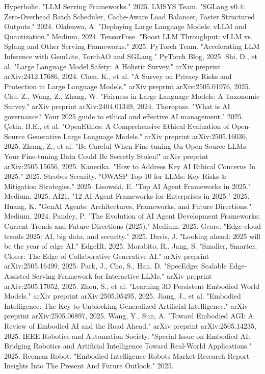 \documentclass{article}
\begin{document}
\begin{thebibliography}{99}
Hyperbolic. "LLM Serving Frameworks." 2025.
LMSYS Team. "SGLang v0.4: Zero-Overhead Batch Scheduler, Cache-Aware Load Balancer, Faster Structured Outputs." 2024.
Olafenwa, A. "Deploying Large Language Models: vLLM and Quantization." Medium, 2024.
TensorFuse. "Boost LLM Throughput: vLLM vs. Sglang and Other Serving Frameworks." 2025.
PyTorch Team. "Accelerating LLM Inference with GemLite, TorchAO and SGLang." PyTorch Blog, 2025.
Shi, D., et al. "Large Language Model Safety: A Holistic Survey." arXiv preprint arXiv:2412.17686, 2024.
Chen, K., et al. "A Survey on Privacy Risks and Protection in Large Language Models." arXiv preprint arXiv:2505.01976, 2025.
Chu, Z., Wang, Z., Zhang, W. "Fairness in Large Language Models: A Taxonomic Survey." arXiv preprint arXiv:2404.01349, 2024.
Thoropass. "What is AI governance? Your 2025 guide to ethical and effective AI management." 2025.
Çetin, B.E., et al. "OpenEthics: A Comprehensive Ethical Evaluation of Open-Source Generative Large Language Models." arXiv preprint arXiv:2505.16036, 2025.
Zhang, Z., et al. "Be Careful When Fine-tuning On Open-Source LLMs: Your Fine-tuning Data Could Be Secretly Stolen!" arXiv preprint arXiv:2505.15656, 2025.
Kanerika. "How to Address Key AI Ethical Concerns In 2025." 2025.
Strobes Security. "OWASP Top 10 for LLMs: Key Risks \& Mitigation Strategies." 2025.
Lisowski, E. "Top AI Agent Frameworks in 2025." Medium, 2025.
AI21. "12 AI Agent Frameworks for Enterprises in 2025." 2025.
Huang, K. "GenAI Agents: Architectures, Frameworks, and Future Directions." Medium, 2024.
Pandey, P. "The Evolution of AI Agent Development Frameworks: Current Trends and Future Directions (2025)." Medium, 2025.
Gcore. "Edge cloud trends 2025: AI, big data, and security." 2025.
Davis, J. "Looking ahead: 2025 will be the year of edge AI." EdgeIR, 2025.
Morabito, R., Jang, S. "Smaller, Smarter, Closer: The Edge of Collaborative Generative AI." arXiv preprint arXiv:2505.16499, 2025.
Park, J., Cho, S., Han, D. "SpecEdge: Scalable Edge-Assisted Serving Framework for Interactive LLMs." arXiv preprint arXiv:2505.17052, 2025.
Zhou, S., et al. "Learning 3D Persistent Embodied World Models." arXiv preprint arXiv:2505.05495, 2025.
Jiang, J., et al. "Embodied Intelligence: The Key to Unblocking Generalized Artificial Intelligence." arXiv preprint arXiv:2505.06897, 2025.
Wang, Y., Sun, A. "Toward Embodied AGI: A Review of Embodied AI and the Road Ahead." arXiv preprint arXiv:2505.14235, 2025.
IEEE Robotics and Automation Society. "Special Issue on Embodied AI: Bridging Robotics and Artificial Intelligence Toward Real-World Applications." 2025.
Reeman Robot. "Embodied Intelligence Robots Market Research Report — Insights Into The Present And Future Outlook." 2025.
\end{thebibliography}
\end{document}
